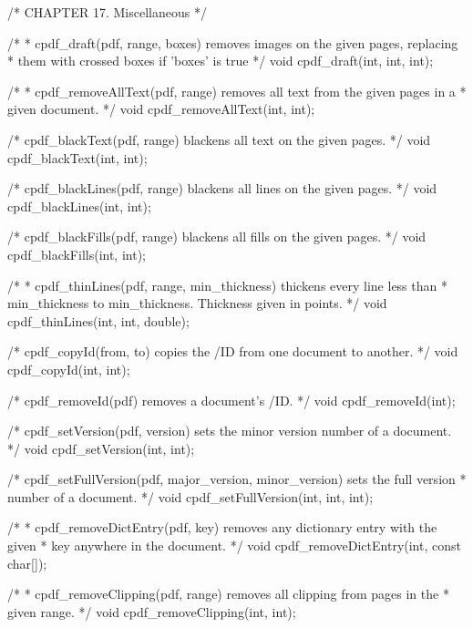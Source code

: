 /* CHAPTER 17. Miscellaneous */

/*
 * cpdf_draft(pdf, range, boxes) removes images on the given pages, replacing
 * them with crossed boxes if 'boxes' is true
 */
void cpdf_draft(int, int, int);

/*
 * cpdf_removeAllText(pdf, range) removes all text from the given pages in a
 * given document.
 */
void cpdf_removeAllText(int, int);

/* cpdf_blackText(pdf, range) blackens all text on the given pages. */
void cpdf_blackText(int, int);

/* cpdf_blackLines(pdf, range) blackens all lines on the given pages. */
void cpdf_blackLines(int, int);

/* cpdf_blackFills(pdf, range) blackens all fills on the given pages. */
void cpdf_blackFills(int, int);

/*
 * cpdf_thinLines(pdf, range, min_thickness) thickens every line less than
 * min_thickness to min_thickness. Thickness given in points.
 */
void cpdf_thinLines(int, int, double);

/* cpdf_copyId(from, to) copies the /ID from one document to another. */
void cpdf_copyId(int, int);

/* cpdf_removeId(pdf) removes a document's /ID. */
void cpdf_removeId(int);

/* cpdf_setVersion(pdf, version) sets the minor version number of a document. */
void cpdf_setVersion(int, int);

/* cpdf_setFullVersion(pdf, major_version, minor_version) sets the full version
 * number of a document. */
void cpdf_setFullVersion(int, int, int);

/*
 * cpdf_removeDictEntry(pdf, key) removes any dictionary entry with the given
 * key anywhere in the document.
 */
void cpdf_removeDictEntry(int, const char[]);

/*
 * cpdf_removeClipping(pdf, range) removes all clipping from pages in the
 * given range.
 */
void cpdf_removeClipping(int, int);

